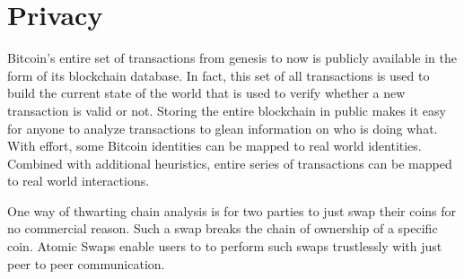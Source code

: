\section{Privacy}
Bitcoin's entire set of transactions from genesis to now is publicly available in the form of its blockchain database. In fact, this set of all transactions is used to build the current state of the world that is used to verify whether a new transaction is valid or not. Storing the entire blockchain in public makes it easy for anyone to analyze transactions to glean information on who is doing what. With effort, some Bitcoin identities can be mapped to real world identities. Combined with additional heuristics, entire series of transactions can be mapped to real world interactions.



One way of thwarting chain analysis is for two parties to just swap their coins for no commercial reason. Such a swap breaks the chain of ownership of a specific coin. Atomic Swaps enable users to to perform such swaps trustlessly with just peer to peer communication.

